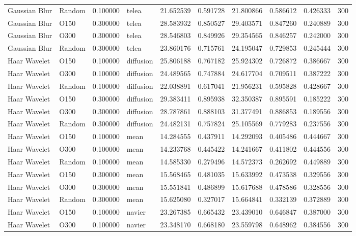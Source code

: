 \begin{table}[h]
\begin{tabular}{llrlrrrrrr}
Gaussian Blur & Random & 0.100000 & telea & 21.652539 & 0.591728 & 21.800866 & 0.586612 & 0.426333 & 300 \\
Gaussian Blur & O150 & 0.300000 & telea & 28.583932 & 0.850527 & 29.403571 & 0.847260 & 0.240889 & 300 \\
Gaussian Blur & O300 & 0.300000 & telea & 28.546803 & 0.849926 & 29.354565 & 0.846257 & 0.242000 & 300 \\
Gaussian Blur & Random & 0.300000 & telea & 23.860176 & 0.715761 & 24.195047 & 0.729853 & 0.245444 & 300 \\
Haar Wavelet & O150 & 0.100000 & diffusion & 25.806188 & 0.767182 & 25.924302 & 0.726872 & 0.386667 & 300 \\
Haar Wavelet & O300 & 0.100000 & diffusion & 24.489565 & 0.747884 & 24.617704 & 0.709511 & 0.387222 & 300 \\
Haar Wavelet & Random & 0.100000 & diffusion & 22.038891 & 0.617041 & 21.956231 & 0.595828 & 0.428667 & 300 \\
Haar Wavelet & O150 & 0.300000 & diffusion & 29.383411 & 0.895938 & 32.350387 & 0.895591 & 0.185222 & 300 \\
Haar Wavelet & O300 & 0.300000 & diffusion & 28.787861 & 0.888103 & 31.377491 & 0.886853 & 0.189556 & 300 \\
Haar Wavelet & Random & 0.300000 & diffusion & 24.482131 & 0.757824 & 25.105569 & 0.779283 & 0.237556 & 300 \\
Haar Wavelet & O150 & 0.100000 & mean & 14.284555 & 0.437911 & 14.292093 & 0.405486 & 0.444667 & 300 \\
Haar Wavelet & O300 & 0.100000 & mean & 14.233768 & 0.445422 & 14.241667 & 0.411802 & 0.444556 & 300 \\
Haar Wavelet & Random & 0.100000 & mean & 14.585330 & 0.279496 & 14.572373 & 0.262692 & 0.449889 & 300 \\
Haar Wavelet & O150 & 0.300000 & mean & 15.568465 & 0.481035 & 15.633992 & 0.473538 & 0.329556 & 300 \\
Haar Wavelet & O300 & 0.300000 & mean & 15.551841 & 0.486899 & 15.617688 & 0.478586 & 0.328556 & 300 \\
Haar Wavelet & Random & 0.300000 & mean & 15.625080 & 0.327017 & 15.664841 & 0.332139 & 0.372889 & 300 \\
Haar Wavelet & O150 & 0.100000 & navier & 23.267385 & 0.665432 & 23.439010 & 0.646847 & 0.387000 & 300 \\
Haar Wavelet & O300 & 0.100000 & navier & 23.348170 & 0.668180 & 23.559798 & 0.648962 & 0.384556 & 300 \\

\end{tabular}
\end{table}
